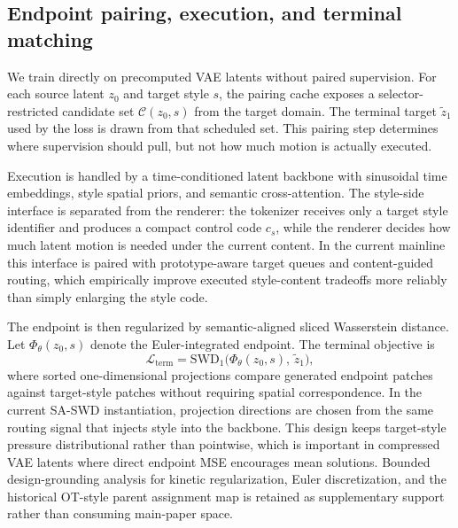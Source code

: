 \documentclass[letterpaper]{article}
\begin{document}
\subsection{Endpoint pairing, execution, and terminal matching}
We train directly on precomputed VAE latents without paired supervision. For each source latent $z_0$ and target style $s$, the pairing cache exposes a selector-restricted candidate set $\mathcal{C}(z_0,s)$ from the target domain. The terminal target $\tilde z_1$ used by the loss is drawn from that scheduled set. This pairing step determines where supervision should pull, but not how much motion is actually executed.

Execution is handled by a time-conditioned latent backbone with sinusoidal time embeddings, style spatial priors, and semantic cross-attention. The style-side interface is separated from the renderer: the tokenizer receives only a target style identifier and produces a compact control code $c_s$, while the renderer decides how much latent motion is needed under the current content. In the current mainline this interface is paired with prototype-aware target queues and content-guided routing, which empirically improve executed style-content tradeoffs more reliably than simply enlarging the style code.

The endpoint is then regularized by semantic-aligned sliced Wasserstein distance. Let $\Phi_\theta(z_0,s)$ denote the Euler-integrated endpoint. The terminal objective is
\begin{equation}
    \mathcal{L}_{\mathrm{term}} =
    \mathrm{SWD}_1\bigl(\Phi_\theta(z_0,s),\,\tilde z_1\bigr),
\end{equation}
where sorted one-dimensional projections compare generated endpoint patches against target-style patches without requiring spatial correspondence. In the current SA-SWD instantiation, projection directions are chosen from the same routing signal that injects style into the backbone. This design keeps target-style pressure distributional rather than pointwise, which is important in compressed VAE latents where direct endpoint MSE encourages mean solutions. Bounded design-grounding analysis for kinetic regularization, Euler discretization, and the historical OT-style parent assignment map is retained as supplementary support rather than consuming main-paper space.
\end{document}
